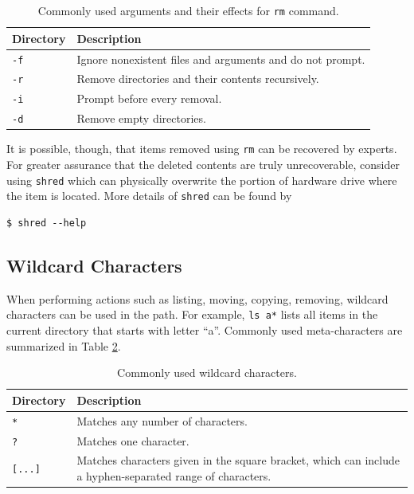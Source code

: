 \begin{table}[!htb]
  \centering \caption{Commonly used arguments and their effects for \texttt{rm} command.}\label{ch:fm:tab:rmcommandargument}
  \begin{tabularx}{\textwidth}{lX}
    \hline
    Directory & Description \\ \hline
    \verb|-f| & Ignore nonexistent files and arguments and do not prompt. \\ 
    \verb|-r| & Remove directories and their contents recursively. \\ 
    \verb|-i| & Prompt before every removal. \\ 
    \verb|-d| & Remove empty directories. \\
    \hline
  \end{tabularx}
\end{table}

It is possible, though, that items removed using \verb|rm| can be recovered by experts. For greater assurance that the deleted contents are truly unrecoverable, consider using \verb|shred| which can physically overwrite the portion of hardware drive where the item is located. More details of \verb|shred| can be found by
\begin{lstlisting}
$ shred --help
\end{lstlisting}

\subsection{Wildcard Characters}

When performing actions such as listing, moving, copying, removing, wildcard characters can be used in the path. For example, \verb|ls a*| lists all items in the current directory that starts with letter ``a''. Commonly used meta-characters are summarized in Table \ref{ch:fm:tab:metacharacters}.

\begin{table}[!htb]
  \centering \caption{Commonly used wildcard characters.}\label{ch:fm:tab:metacharacters}
  \begin{tabularx}{\textwidth}{lX}
    \hline
    Directory & Description \\ \hline
    \verb|*| & Matches any number of characters. \\ 
    \verb|?| & Matches one character. \\ 
    \verb|[...]| & Matches characters given in the square bracket, which can include a hyphen-separated range of characters. \\
    \hline
  \end{tabularx}
\end{table}

